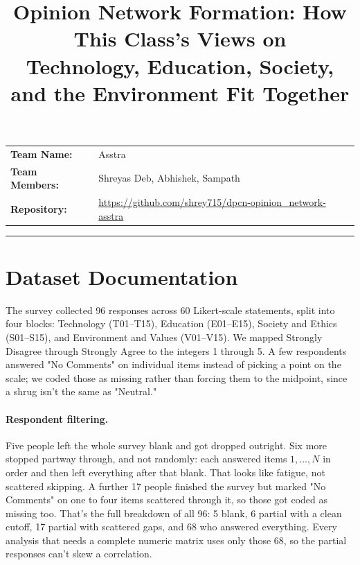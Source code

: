\documentclass[11pt]{article}
\title{\Large Opinion Network Formation: How This Class's Views on\\
Technology, Education, Society, and the Environment Fit Together}
\author{}
\date{}
\begin{document}
\maketitle
\vspace{-3.5em}

\noindent
\begin{tabular}{@{}ll}
\textbf{Team Name:} & Asstra \\
\textbf{Team Members:} & Shreyas Deb, Abhishek, Sampath \\
\textbf{Repository:} & \url{https://github.com/shrey715/dpcn-opinion_network-asstra}
\end{tabular}

\vspace{0.8em}
\hrule
\vspace{0.4em}

\section{Dataset Documentation}

The survey collected 96 responses across 60 Likert-scale statements, split into four blocks:
Technology (T01--T15), Education (E01--E15), Society and Ethics (S01--S15), and Environment and Values
(V01--V15). We mapped Strongly Disagree through Strongly Agree to the integers 1 through 5. A few
respondents answered "No Comments" on individual items instead of picking a point on the scale; we
coded those as missing rather than forcing them to the midpoint, since a shrug isn't the same as
"Neutral."

\paragraph{Respondent filtering.} Five people left the whole survey blank and got dropped outright. Six
more stopped partway through, and not randomly: each answered items $1, \dots, N$ in order and then
left everything after that blank. That looks like fatigue, not scattered skipping. A further 17 people
finished the survey but marked "No Comments" on one to four items scattered through it, so those got
coded as missing too. That's the full breakdown of all 96: 5 blank, 6 partial with a clean cutoff, 17
partial with scattered gaps, and 68 who answered everything. Every analysis that needs a complete
numeric matrix uses only those 68, so the partial responses can't skew a correlation.
\end{document}
